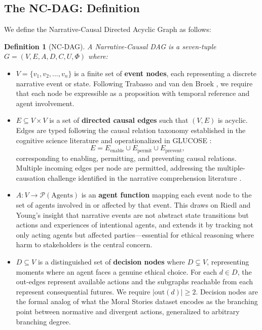 \documentclass[11pt,letterpaper]{article}
\theoremstyle{defn}
\newtheorem{definition}{Definition}
\begin{document}
\subsection{The NC-DAG: Definition}

We define the Narrative-Causal Directed Acyclic Graph as follows:

\begin{definition}[NC-DAG]
A Narrative-Causal DAG is a seven-tuple $G = (V, E, A, D, C, U, \Phi)$ where:
\end{definition}

\begin{itemize}[leftmargin=2em,itemsep=0.4em]
\item $V = \{v_1, v_2, \ldots, v_n\}$ is a finite set of \textbf{event nodes}, each representing a discrete narrative event or state. Following Trabasso and van den Broek \citeyearpar{trabasso1985causal}, we require that each node be expressible as a proposition with temporal reference and agent involvement.

\item $E \subseteq V \times V$ is a set of \textbf{directed causal edges} such that $(V, E)$ is acyclic. Edges are typed following the causal relation taxonomy established in the cognitive science literature and operationalized in GLUCOSE \citep{mostafazadeh2020}:
\[ E = E_{\text{enable}} \cup E_{\text{permit}} \cup E_{\text{prevent}}, \]
corresponding to enabling, permitting, and preventing causal relations. Multiple incoming edges per node are permitted, addressing the multiple-causation challenge identified in the narrative comprehension literature \citep{chen2024causal}.

\item $A: V \to \mathcal{P}(\text{Agents})$ is an \textbf{agent function} mapping each event node to the set of agents involved in or affected by that event. This draws on Riedl and Young's \citeyearpar{riedl2010} insight that narrative events are not abstract state transitions but actions and experiences of intentional agents, and extends it by tracking not only acting agents but affected parties---essential for ethical reasoning where harm to stakeholders is the central concern.

\item $D \subseteq V$ is a distinguished set of \textbf{decision nodes} where $D \subsetneq V$, representing moments where an agent faces a genuine ethical choice. For each $d \in D$, the out-edges represent available actions and the subgraphs reachable from each represent consequential futures. We require $|\text{out}(d)| \geq 2$. Decision nodes are the formal analog of what the Moral Stories dataset \citep{emelin2021moral} encodes as the branching point between normative and divergent actions, generalized to arbitrary branching degree.


\end{itemize}
\end{document}
